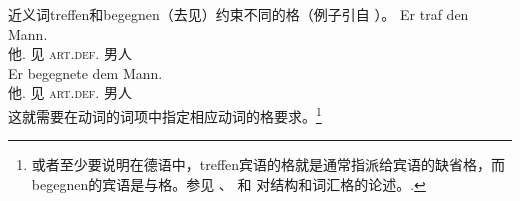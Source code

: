 \begin{exe}
\begin{xlist}[iv.]
\begin{exe}
\begin{xlist}[iv.]
\zl
近义词treffen和begegnen（去见）约束不同的格（例子引自 \citet[]{ps}）。
\eal
\ex 
\gll Er traf den Mann.\\
     他.\nom{} 见 \textsc{art}.\textsc{def}.\acc{} 男人\\
\ex 
\gll Er begegnete dem Mann.\\
     他.\nom{} 见 \textsc{art}.\textsc{def}.\dat{} 男人\\
\zl
这就需要在动词的词项中指定相应动词的格要求。\footnote{%
  或者至少要说明在德语中，treffen宾语的格就是通常指派给宾语的缺省格，而begegnen的宾语是与格。参见 、 和 对结构和词汇格的论述。.
}
%


\end{xlist}
\end{exe}
\end{xlist}
\end{exe}
